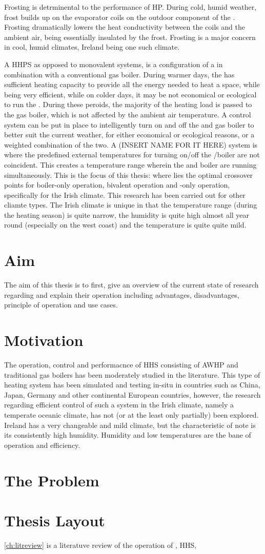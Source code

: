 Frosting is detrminental to the performance of \acs{HP}. During cold, humid weather, frost builds up on the evaporator coils on the outdoor component of the \HP. Frosting dramatically lowers the heat conductivity between the coils and the ambient air, being essentially insulated by the frost. Frosting is a major concern in cool, humid climates, Ireland being one such climate.

A \ac{HHPS} as opposed to monovalent systems, is a configuration of a \HP in combination with a conventional gas boiler. During warmer days, the \HP has sufficient heating capacity to provide all the energy needed to heat a space, while being very efficient, while on colder days, it may be not economical or ecological to run the \HP. During these peroids, the majority of the heating load is passed to the gas boiler, which is not affected by the ambient air temperature. A control system can be put in place to intelligently turn on and off the \HP and gas boiler to better suit the current weather, for either economical or ecological reasons, or a weighted combination of the two. A (INSERT NAME FOR IT HERE) system is where the predefined external temperatures for turning on/off the \HP/boiler are not coincident. This creates a temperature range wherein the \HP and boiler are running simultaneously. This is the focus of this thesis: where lies the optimal crossover points for boiler-only operation, bivalent operation and \HP-only operation, specifically for the Irish climate. This research has been carried out for other cliamte types. The Irish climate is unique in that the temperature range (during the heating season) is quite narrow, the humidity is quite high almost all year round (especially on the west coast) and the temperature is quite quite mild.  

\section{Aim}
The aim of this thesis is to first, give an overview of the current state of research regarding \HPs and explain their operation including advantages, disadvantages, principle of operation and use cases. 

\section{Motivation}
The operation, control and performacnce of \acs{HHS} consisting of \acs{AWHP} and traditional gas boilers has been moderately studied in the literature. This type of heating system has been simulated and testing in-situ in countries such as China, Japan, Germany and other continental European countries, however, the research regarding efficient control of such a system in the Irish climate, namely a temperate oceanic climate, has not (or at the least only partially) been explored. Ireland has a very changeable and mild climate, but the characteristic of note is its consistently high humidity. Humidity and low temperatures are the bane of \HP operation and efficiency.

\section{The Problem} %

\section{Thesis Layout}
\cref{ch:litreview} is a literatuve review of the operation of \HPs, \acs{HHS}, 
